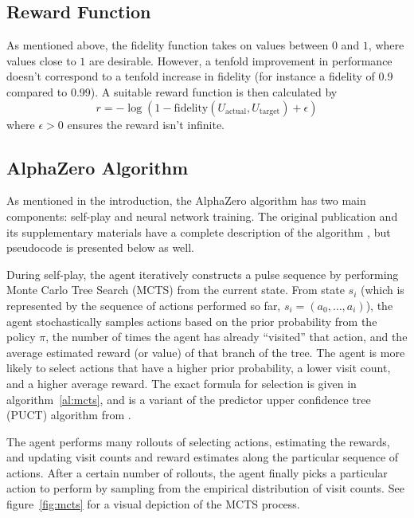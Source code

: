 \subsection{Reward Function}

As mentioned above, the fidelity function takes on values between $0$ and $1$, where values close to $1$ are desirable.
However, a tenfold improvement in performance doesn't correspond to a tenfold increase in fidelity (for instance a fidelity of 0.9 compared to 0.99). A suitable reward function is then calculated by
\begin{equation}
    r = -\log(1-\text{fidelity}(U_\text{actual}, U_\text{target}) + \epsilon)
\end{equation}
where $\epsilon>0$ ensures the reward isn't infinite.

\subsection{AlphaZero Algorithm}

As mentioned in the introduction, the AlphaZero algorithm has two main components: self-play and neural network training. The original publication and its supplementary materials have a complete description of the algorithm \cite{Silver1140}, but pseudocode is presented below as well.

During self-play, the agent iteratively constructs a pulse sequence by performing Monte Carlo Tree Search (MCTS) from the current state. From state $s_i$ (which is represented by the sequence of actions performed so far, $s_i = (a_0, \dots, a_i)$), the agent stochastically samples actions based on the prior probability from the policy $\pi$, the number of times the agent has already ``visited'' that action, and the average estimated reward (or value) of that branch of the tree. The agent is more likely to select actions that have a higher prior probability, a lower visit count, and a higher average reward. The exact formula for selection is given in algorithm~\ref{al:mcts},
and is a variant of the predictor upper confidence tree (PUCT) algorithm from \cite{Rosin:2011uu}.

The agent performs many rollouts of selecting actions, estimating the rewards, and updating visit counts and reward estimates along the particular sequence of actions. After a certain number of rollouts, the agent finally picks a particular action to perform by sampling from the empirical distribution of visit counts.
See figure~\ref{fig:mcts} for a visual depiction of the MCTS process.


